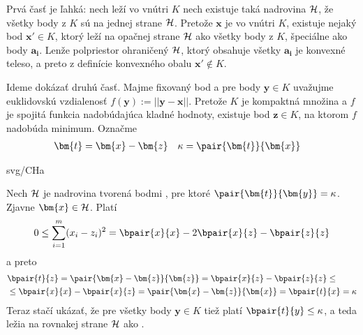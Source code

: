 \begin{shaded}
\begin{dokaz}
  Prvá časť je ľahká: nech  leží vo vnútri $K$ nech existuje taká nadrovina $\cal H$, že všetky body z $K$
  sú na jednej strane $\cal H$. Pretože $\bm{x}$ je vo vnútri $K$, existuje nejaký bod $\bm{x'}\in K$, ktorý leží
  na opačnej strane $\cal H$ ako všetky body z $K$, špeciálne ako body $\bm{a_i}$. 
  Lenže polpriestor ohraničený $\cal H$, ktorý obsahuje 
  všetky $\bm{a_i}$ je konvexné teleso, a preto z definície konvexného obalu $\bm{x'}\not\in K$.

\noindent
Ideme dokázať druhú časť.
Majme fixovaný  bod  a pre body $\bm{y}\in K$ uvažujme euklidovskú vzdialenosť $f(\bm{y}):=||\bm{y}-\bm{x}||$. 
  Pretože $K$ je kompaktná množina a $f$ je spojitá funkcia nadobúdajúca kladné hodnoty, existuje bod
  $\bm{z}\in K$, na ktorom $f$ nadobúda minimum. Označme 
  \begin{align*}
    \bm{t}&=\bm{x}-\bm{z} & \kappa&= \pair{\bm{t}}{\bm{x}}
  \end{align*}

\begin{minipage}[t]{4.5cm}
  \vspace{0pt}
  \begin{myfig}{\textwidth}{svg/CHa}
  \end{myfig}
\end{minipage}\hspace*{1cm}\begin{minipage}[t]{\textwidth-7cm}
  \vspace{0pt}
  Nech $\cal H$ je nadrovina tvorená bodmi , pre ktoré $\pair{\bm{t}}{\bm{y}}=\kappa$.
  Zjavne $\bm{x}\in{\cal H}$. Platí
  $$0\le\sum_{i=1}^m(x_i-z_i)^2=%
  \bpair{x}{x}-2\bpair{x}{z}-\bpair{z}{z}$$
  a preto
  \begin{align*}&\bpair{t}{z}=\pair{\bm{x}-\bm{z}}{\bm{z}}=\bpair{x}{z}-\bpair{z}{z}\le\\
                &\le\bpair{x}{x}-\bpair{x}{z}=\pair{\bm{x}-\bm{z}}{\bm{x}}=\bpair{t}{x}=\kappa
  \end{align*}
  \noindent
  Teraz stačí ukázať, že pre všetky body $\bm{y}\in K$ tiež platí $\bpair{t}{y}\le\kappa$, a teda
  ležia na rovnakej strane $\cal H$ ako .
\end{minipage}


\end{dokaz}
\end{shaded}
